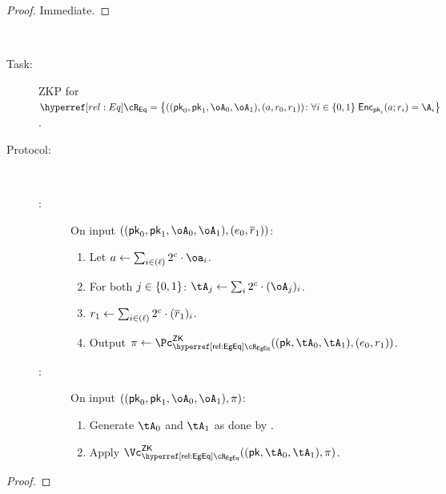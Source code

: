 \begin{description}
\begin{description}
		
	\end{description}
	
	\begin{proof}
		Immediate.
	\end{proof}
	
\item[Equality.]~ 

\begin{description}
	\item[Task:] ZKP for $\rEq =\rEqDef$.
	
	\item[Protocol:]~
	
	\begin{description}
		
	\item[\Pc:]  On input $((\pk_0,\pk_1,\oA_0,\oA_1),(e_0,\orr_1))$: 
	

	\begin{enumerate}
		
		\item Let  $a \asn  \sum_{i\in (\ell)}    2^\cs \cdot \oa_i$. 
		
		\item For both $j\in \zo$:  $\tA_j \asn  \sum_i  2^\cs \cdot (\oA_j)_i$. 
		
		  
		\item    $r_1 \leftarrow  \sum_{i\in (\ell)}  2^c \cdot (\overline{r}_1)_i$. 
			
		 
		\item Output $\pi \asn \pZK{\rEgEq}((\pk,\tA_0,\tA_1), (e_0,r_1))$.
				 
	\end{enumerate}
	
	\item[\Vc:] On input $((\pk_0,\pk_1,\oA_0,\oA_1),\pi)$: 
	
	\begin{enumerate}
		\item Generate $\tA_0$ and  $\tA_1$ as done by \Pc.
		
	\item Apply $\vZK{\rEgEq}((\pk,\tA_0,\tA_1), \pi)$.
	
	\end{enumerate}
\end{description}
\end{description}

		

\begin{proof}
\end{proof}
  



\end{description}
